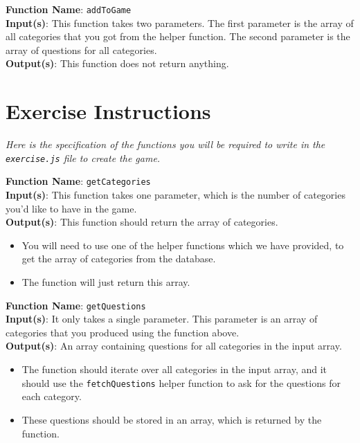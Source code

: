 \documentclass{article}
\begin{document}
        \vspace{3mm}

        \textbf{Function Name}: \texttt{addToGame} \\
        \textbf{Input(s)}: This function takes two parameters. The first parameter is the array of all categories that you got from the helper function. The second parameter is the array of questions for all categories. \\
        \textbf{Output(s)}: This function does not return anything.

    \vspace{5mm}

    \section*{Exercise Instructions}
        \textit{Here is the specification of the functions you will be required to write in the \texttt{exercise.js} file to create the game.}

	\textbf{Function Name}: \texttt{getCategories} \\
        \textbf{Input(s)}: This function takes one parameter, which is the number of categories you'd like to have in the game. \\
        \textbf{Output(s)}: This function should return the array of categories.

        \begin{itemize}
            \item You will need to use one of the helper functions which we have provided, to get the array of categories from the database.
            \item The function will just return this array.
        \end{itemize}

        \textbf{Function Name}: \texttt{getQuestions} \\
        \textbf{Input(s)}: It only takes a single parameter. This parameter is an array of categories that you produced using the function above. \\
        \textbf{Output(s)}: An array containing questions for all categories in the input array. 

        \begin{itemize}
            \item The function should iterate over all categories in the input array, and it should use the \texttt{fetchQuestions} helper function to ask for the questions for each category.
            \item These questions should be stored in an array, which is returned by the function.
        \end{itemize}
\end{document}
